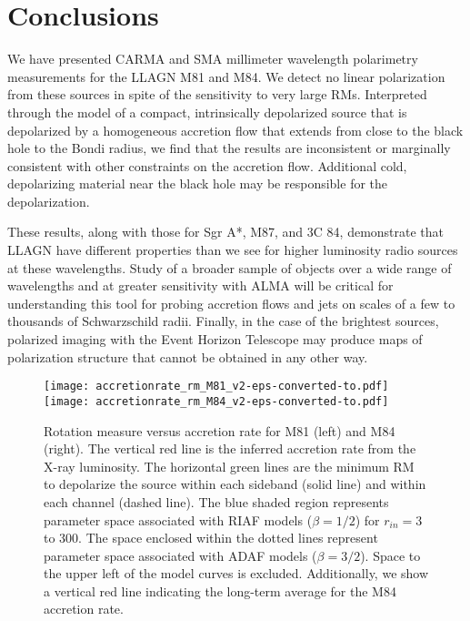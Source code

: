 \documentclass[12pt,preprint]{aastex}
\begin{document}
\section{Conclusions}

We have presented CARMA and SMA millimeter wavelength polarimetry measurements for the
LLAGN M81 and M84.  We detect no linear polarization from these sources in spite of the
sensitivity to very large RMs.  Interpreted through the model of a compact, 
intrinsically depolarized source that is depolarized by a homogeneous accretion flow that extends from close to the black hole to the Bondi radius, we find that
the results are inconsistent or marginally consistent with other constraints on the
accretion flow.  Additional cold, depolarizing material near the black hole may be
responsible for the depolarization.  

These results, along with those for Sgr A*, M87, and 3C 84, demonstrate that LLAGN have
different properties than we see for higher luminosity radio sources at these wavelengths.
Study of a broader sample of objects over a wide range of wavelengths and at
greater sensitivity with ALMA will be critical 
for understanding this tool for probing accretion flows and jets on scales of a few to 
thousands of Schwarzschild radii.  Finally, in the case of the brightest sources, polarized
imaging with the Event Horizon Telescope may produce maps of polarization structure
that cannot be obtained in any other way.



\begin{figure}[p!]
\texttt{[image: accretionrate\_rm\_M81\_v2-eps-converted-to.pdf]}
\texttt{[image: accretionrate\_rm\_M84\_v2-eps-converted-to.pdf]}
\caption{Rotation measure versus accretion rate for M81 (left) and M84 (right).  The vertical
red line is the inferred accretion rate from the X-ray luminosity.
The horizontal green lines are the minimum RM to depolarize the source 
within each sideband (solid line) and within each channel (dashed line).
The blue shaded region represents parameter space associated with
RIAF models ($\beta=1/2$) for $r_{in} = 3$ to 300.  The space 
enclosed within the dotted lines represent parameter space associated with
ADAF models ($\beta=3/2$).  Space to the upper left of the model curves is
excluded.
Additionally, we show
a vertical red line indicating the long-term average for the M84
accretion rate.
\label{fig:rm}
}
\end{figure}
\end{document}
